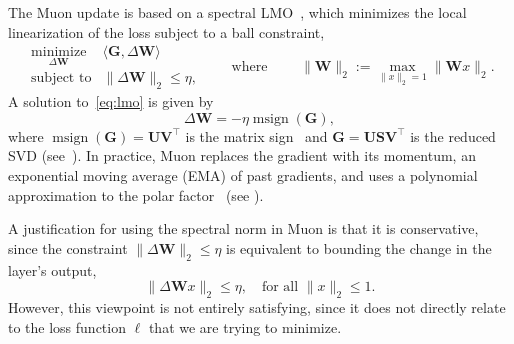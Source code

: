 \documentclass{article}
\newcommand{\mat}[1]{\bm{#1}}
\newcommand{\cL}{\mathcal{L}}
\newcommand{\R}{\mathbb{R}}
\newcommand{\ip}[1]{\langle #1 \rangle}
\DeclareMathOperator{\msign}{msign}          %
\newcommand{\norm}[1]{\| #1\|}
\begin{document}

The Muon update is based on a spectral LMO~\cite{bernstein2025modular,pmlr-v38-carlson15,carlson2015preconditioned}, which minimizes the local linearization of the loss subject to a ball constraint,
\begin{equation}
 \begin{array}{ll}
  \underset{\Delta\mat{W}}{\mathrm{minimize}} &
  \ip{\mat{G}, \Delta\mat{W}} \\[2pt]
  \mbox{subject to} &
  \displaystyle
  \norm{\Delta\mat{W}}_2
  \le \eta,
  \end{array}
  \qquad \mbox{where }\qquad
\|\mat{W}\|_2 := \max_{\|x\|_2 =1} \|\mat{W} x \|_2.
  \label{eq:lmo}
\end{equation}
A solution to~\eqref{eq:lmo} is given by
\[
    \Delta\mat{W} = -\eta \msign(\mat{G}),
\]
where $\msign(\mat{G})=\mat{U}\mat{V}^\top$ is the matrix sign~\cite{bernstein2025modular}
and $\mat{G}=\mat{U}\mat{S} \mat{V}^\top$ is the reduced SVD (see~). In
practice, Muon replaces the gradient with its momentum, an exponential
moving average (EMA) of past gradients, and uses a polynomial approximation
to the polar factor~\cite{polarexpress,gram_ns} (see ).


A justification for using the spectral norm in Muon is that it is conservative, since the constraint $\norm{\Delta\mat{W}}_2 \le \eta$ is equivalent to bounding the change in the layer's output,
\[\norm{\Delta\mat{W} x}_2 \leq \eta, \quad \text{for all } \norm{x}_2 \leq 1.\]
However, this viewpoint is not entirely satisfying, since it does not directly relate to the loss function $\ell$ that we are trying to minimize.
\end{document}

